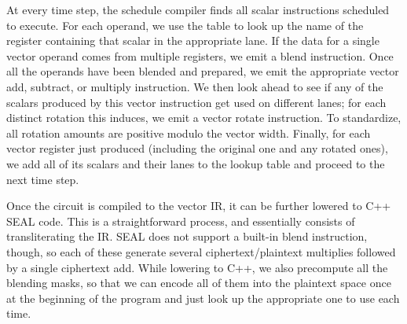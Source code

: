 At every time step, the schedule compiler finds all scalar instructions scheduled to execute.
For each operand, we use the table to look up the name of the register containing that scalar in the appropriate lane.
If the data for a single vector operand comes from multiple registers, we emit a blend instruction.
Once all the operands have been blended and prepared, we emit the appropriate vector add, subtract, or multiply instruction.
We then look ahead to see if any of the scalars produced by this vector instruction get used on different lanes; for each distinct rotation this induces, we emit a vector rotate instruction.
To standardize, all rotation amounts are positive modulo the vector width.
Finally, for each vector register just produced (including the original one and any rotated ones), we add all of its scalars and their lanes to the lookup table and proceed to the next time step.

Once the circuit is compiled to the vector IR, it can be further lowered to C++ SEAL code.
This is a straightforward process, and essentially consists of transliterating the IR. 
SEAL does not support a built-in blend instruction, though, so each of these generate several ciphertext/plaintext multiplies followed by a single ciphertext add.
While lowering to C++, we also precompute all the blending masks, so that we can encode all of them into the plaintext space once at the beginning of the program and just look up the appropriate one to use each time.


